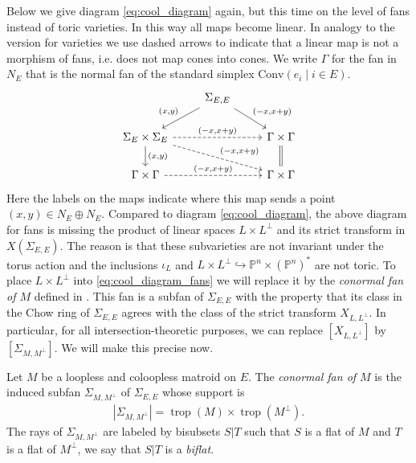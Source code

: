 \documentclass[12pt,a4paper,english]{scrartcl}
\newcommand{\PP}{\mathbb{P}}
\DeclareMathOperator{\trop}{trop}
\begin{document}
Below we give diagram \eqref{eq:cool_diagram} again, but this time on the level of fans instead of toric varieties. In this way all maps become linear. In analogy to the version for varieties we use dashed arrows to indicate that a linear map is not a morphism of fans, i.e. does not map cones into cones. We write $\Gamma$ for the fan in $N_E$ that is the normal fan of the standard simplex $\text{Conv}(e_i\mid i\in E)$.
\begin{equation}
\label{eq:cool_diagram_fans}
\begin{tikzcd}
& {\Sigma_{E,E}} \arrow[ld, "{(x,y)}"'] \arrow[rd, "{(-x,x+y)}"] &                                                    \\
\Sigma_E \times \Sigma_E \arrow[d, "{(x,y)}"] \arrow[rr, "{(-x,x+y)}", dashed] \arrow[rrd, "{(-x,x+y)}", dashed] &                                                                & \Gamma\times \Gamma \arrow[d, no head, equals] \\
\Gamma \times \Gamma \arrow[rr, "{(-x,x+y)}", dashed]                                              &                                                                & \Gamma \times \Gamma                              
\end{tikzcd}
\end{equation}
Here the labels on the maps indicate where this map sends a point $(x,y)\in N_E\oplus N_E$. 
Compared to diagram \eqref{eq:cool_diagram}, the above diagram for fans is missing the product of linear spaces $L\times L^\perp$ and its strict transform in $X(\Sigma_{E,E})$. The reason is that these subvarieties are not invariant under the torus action and the inclusions $\iota_L$ and $L\times L^\perp \hookrightarrow \PP^n \times (\PP^n)^*$ are not toric. To place $L\times L^\perp$ into \eqref{eq:cool_diagram_fans} we will replace it by the \emph{conormal fan of $M$} defined in \cite[Section 3.4]{Ardila2022}. This fan is a subfan of $\Sigma_{E,E}$ with the property that its class in the Chow ring of $\Sigma_{E,E}$ agrees with the class of the strict transform $X_{L,L^\perp}$. In particular, for all intersection-theoretic purposes, we can replace $[X_{L,L^\perp}]$ by $[\Sigma_{M,M^\perp}]$. We will make this precise now.

\begin{definition}
\label{def: conormal fan}
Let $M$ be a loopless and coloopless matroid on $E$. The \emph{conormal fan of $M$} is the induced subfan $\Sigma_{M,M^\perp}$ of $\Sigma_{E,E}$ whose support is
\begin{align*}
|\Sigma_{M,M^\perp}|=\trop(M)\times \trop(M^\perp).
\end{align*}
The rays of $\Sigma_{M,M^\perp}$ are labeled by bisubsets $S|T$ such that $S$ is a flat of $M$ and $T$ is a flat of $M^\perp$, we say that $S|T$ is a \emph{biflat}.
\end{definition}
\end{document}
